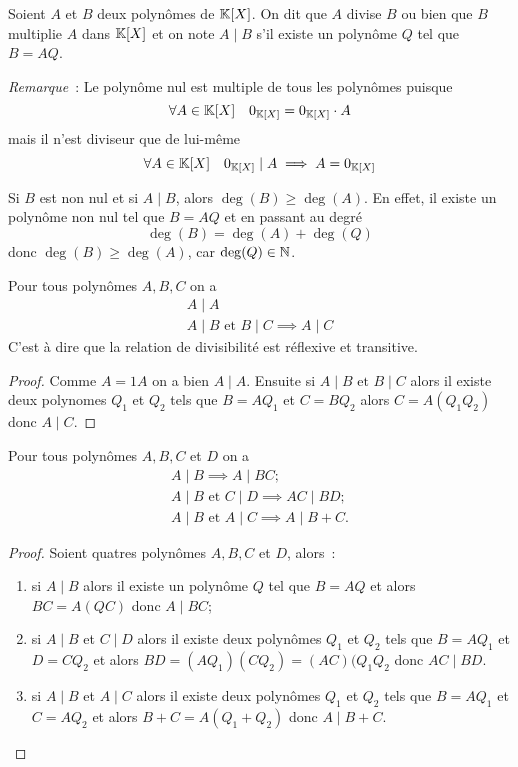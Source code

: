 \begin{defdef}
  Soient $A$ et $B$ deux polynômes de $\mathbb{K}[X]$. On dit que $A$ divise $B$ ou bien que $B$ multiplie $A$ dans $\mathbb{K}[X]$ et on note $A\mid{}B$ s'il existe un polynôme $Q$ tel que $B=AQ$.
\end{defdef}

\emph{Remarque}~: Le polynôme nul est multiple de tous les polynômes puisque
\begin{equation}
  \forall A \in \mathbb{K}[X] \quad 0_{\mathbb{K}[X]} = 0_{\mathbb{K}[X]} \cdot A
\end{equation}
mais il n'est diviseur que de lui-même
\begin{equation}
  \forall A \in \mathbb{K}[X] \quad 0_{\mathbb{K}[X]}\mid{}A \implies A=0_{\mathbb{K}[X]}
\end{equation}

Si $B$ est non nul et si $A\mid{}B$, alors $\deg(B) \geqslant \deg(A)$. En effet, il existe un polynôme non nul tel que $B=AQ$ et en passant au degré
\begin{equation}
  \deg(B) = \deg(A)+\deg(Q)
\end{equation}
donc $\deg(B) \geqslant \deg(A)$, car $\deg(Q)\in \mathbb{N}$.

\begin{prop}
  Pour tous polynômes $A,B,C$ on a
  \begin{align}
    A\mid{}A \\
    A\mid{}B \text{~et~} B\mid{}C \implies A\mid{}C
  \end{align}
C'est à dire que la relation de divisibilité est réflexive et transitive.
\end{prop}
\begin{proof}
  Comme $A=1 A$ on a bien $A\mid{}A$. Ensuite si $A\mid{}B \text{~et~} B\mid{}C$ alors il existe deux polynomes $Q_1$ et $Q_2$ tels que $B=AQ_1$ et $C=BQ_2$ alors $C=A(Q_1Q_2)$ donc $A\mid{}C$.
\end{proof}

\begin{prop}
  Pour tous polynômes $A,B,C$ et $D$ on a
  \begin{gather}
    A\mid{}B \implies A\mid{}BC ;\\
    A\mid{}B \text{~et~} C\mid{}D \implies AC\mid{}BD ;\\
    A\mid{}B \text{~et~} A\mid{}C \implies A\mid{}B+C.
  \end{gather}
\end{prop}
\begin{proof} Soient quatres polynômes $A,B,C$ et $D$, alors~:
  \begin{enumerate}
  \item si $A\mid{}B$ alors il existe un polynôme $Q$ tel que $B=AQ$ et alors $BC=A(QC)$ donc $A\mid{}BC$;
  \item si $A\mid{}B$ et $C\mid{}D$ alors il existe deux polynômes $Q_1$ et $Q_2$ tels que $B=AQ_1$ et $D=CQ_2$ et alors $BD = (AQ_1)(CQ_2)=(AC)(Q_1Q_2$ donc $AC\mid{}BD$.
  \item si $A\mid{}B$ et $A\mid{}C$ alors il existe deux polynômes $Q_1$ et $Q_2$ tels que $B=AQ_1$ et $C=AQ_2$ et alors $B+C = A(Q_1+Q_2)$ donc $A\mid{}B+C$.
  \end{enumerate}
\end{proof}

